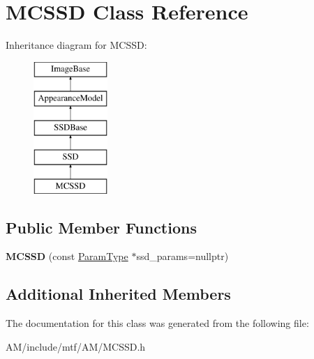 \hypertarget{classMCSSD}{\section{M\-C\-S\-S\-D Class Reference}
\label{classMCSSD}
}
Inheritance diagram for M\-C\-S\-S\-D\-:\begin{figure}[H]
\begin{center}
\leavevmode
\includegraphics[height=5.000000cm]{classMCSSD}
\end{center}
\end{figure}
\subsection*{Public Member Functions}
\begin{DoxyCompactItemize}
\item 
\hypertarget{classMCSSD_ac6fb40c485cad3c5148f99f9d9fec841}{{\bfseries M\-C\-S\-S\-D} (const \hyperlink{structAMParams}{Param\-Type} $\ast$ssd\-\_\-params=nullptr)}\label{classMCSSD_ac6fb40c485cad3c5148f99f9d9fec841}

\end{DoxyCompactItemize}
\subsection*{Additional Inherited Members}


The documentation for this class was generated from the following file\-:\begin{DoxyCompactItemize}
\item 
A\-M/include/mtf/\-A\-M/M\-C\-S\-S\-D.\-h\end{DoxyCompactItemize}
